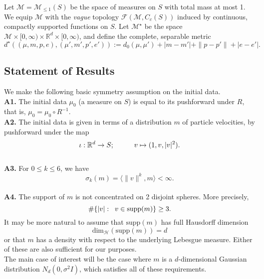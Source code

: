 \begin{definition} Let $\mathcal{M}=\mathcal{M}_{\le 1}(S)$ be the space of measures on $S$ with total mass at most 1. We equip $\mathcal{M}$ with the \emph{vague} topology $\mathcal{F}(\mathcal{M}, C_c(S))$ induced by continuous, compactly supported functions on $S$. Let $\mathcal{M}^\star$ be the space $\mathcal{M}\times [0,\infty)\times \mathbb{R}^d\times [0, \infty)$, and define the complete, separable metric \begin{equation} d^\star\left((\mu, m, p, e), (\mu', m',p',e')\right):=d_0(\mu, \mu')+|m-m'|+\|p-p'\|+|e-e'|. \end{equation} \end{definition}
\subsection{Statement of Results}

We make the following basic symmetry assumption on the initial data.
\\\textbf{A1.} The initial data $\mu_0$ (a measure on $S$) is equal to its pushforward under $R$, that is, $\mu_0 = \mu_0 \circ R^{-1}$.
\\ \textbf{A2.} The initial data is given in terms of a distribution $m$ of particle velocities, by pushforward under the map
\begin{equation}
    \iota: \mathbb{R}^d \rightarrow S; \hspace{1cm} v\mapsto (1, v, |v|^2).
\end{equation}
\\ \textbf{A3.} For $0\leq k\leq 6$, we have
\begin{equation}
    \sigma_k(m)=\langle \|v\|^k, m\rangle <\infty.
\end{equation}
\\ \textbf{A4.} The support of $m$ is not concentrated on 2 disjoint spheres. More precisely, \begin{equation}
    \#\{|v|: \hspace{0.2cm} v\in \text{supp}(m)\} \ge 3.
\end{equation} It may be more natural to assume that $\text{supp}(m)$ has full Hausdorff dimension \begin{equation} \text{dim}_\mathcal{H}(\text{supp}(m))=d \end{equation} or that $m$ has a density with respect to the underlying Lebesgue measure. Either of these are also sufficient for our purposes.
\medskip \\ The main case of interest will be the case where $m$ is a $d$-dimensional Gaussian distribution $N_d(0, \sigma^2I)$, which satisfies all of these requirements.

